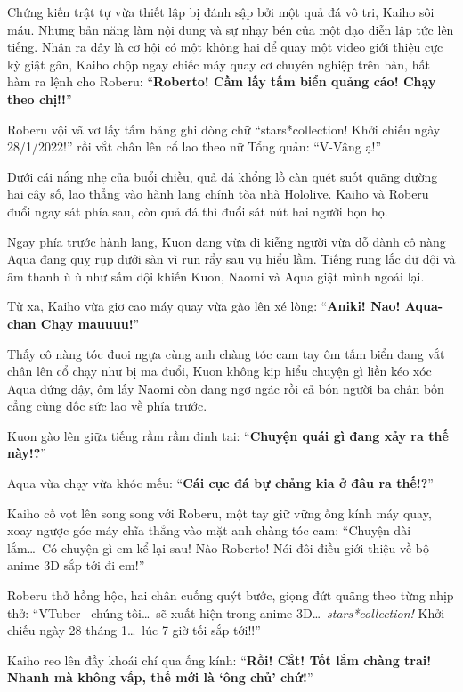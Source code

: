 \documentclass[../main.tex]{subfiles}
\begin{document}
Chứng kiến trật tự vừa thiết lập bị đánh sập bởi một quả đá vô tri, Kaiho sôi máu. Nhưng bản năng làm nội dung và sự nhạy bén của một đạo diễn lập tức lên tiếng. Nhận ra đây là cơ hội có một không hai để quay một video giới thiệu cực kỳ giật gân, Kaiho chộp ngay chiếc máy quay cơ chuyên nghiệp trên bàn, hất hàm ra lệnh cho Roberu: ``\textbf{Roberto! Cầm lấy tấm biển quảng cáo! Chạy theo chị!!}''

Roberu vội vã vơ lấy tấm bảng ghi dòng chữ ``stars*collection! Khởi chiếu ngày 28/1/2022!'' rồi vắt chân lên cổ lao theo nữ Tổng quản: ``V-Vâng ạ!''

\ct

Dưới cái nắng nhẹ của buổi chiều, quả đá khổng lồ càn quét suốt quãng đường hai cây số, lao thẳng vào hành lang chính tòa nhà Hololive. Kaiho và Roberu đuổi ngay sát phía sau, còn quả đá thì đuổi sát nút hai người bọn họ.

Ngay phía trước hành lang, Kuon đang vừa đi kiễng người vừa dỗ dành cô nàng Aqua đang quỵ rụp dưới sàn vì run rẩy sau vụ hiểu lầm. Tiếng rung lắc dữ dội và âm thanh ù ù như sấm dội khiến Kuon, Naomi và Aqua giật mình ngoái lại.


Từ xa, Kaiho vừa giơ cao máy quay vừa gào lên xé lòng: ``\textbf{Aniki! Nao! Aqua-chan Chạy mauuuu!}''

Thấy cô nàng tóc đuoi ngựa cùng anh chàng tóc cam tay ôm tấm biển đang vắt chân lên cổ chạy như bị ma đuổi, Kuon không kịp hiểu chuyện gì liền kéo xóc Aqua đứng dậy, ôm lấy Naomi còn đang ngơ ngác rồi cả bốn người ba chân bốn cẳng cùng dốc sức lao về phía trước.

Kuon gào lên giữa tiếng rầm rầm đinh tai: ``\textbf{Chuyện quái gì đang xảy ra thế này!?}''

Aqua vừa chạy vừa khóc mếu: ``\textbf{Cái cục đá bự chảng kia ở đâu ra thế!?}''

Kaiho cố vọt lên song song với Roberu, một tay giữ vững ống kính máy quay, xoay ngược góc máy chĩa thẳng vào mặt anh chàng tóc cam: ``Chuyện dài lắm\dots\ Có chuyện gì em kể lại sau! Nào Roberto! Nói đôi điều giới thiệu về bộ anime 3D sắp tới đi em!''

Roberu thở hồng hộc, hai chân cuống quýt bước, giọng đứt quãng theo từng nhịp thở: ``VTuber \hls\ chúng tôi\dots\ sẽ xuất hiện trong anime 3D\dots\ \textit{stars*collection!} Khởi chiếu ngày 28 tháng 1\dots\ lúc 7 giờ tối sắp tới!!''

Kaiho reo lên đầy khoái chí qua ống kính: ``\textbf{Rồi! Cắt! Tốt lắm chàng trai! Nhanh mà không vấp, thế mới là `ông chủ' chứ!}''
\end{document}
